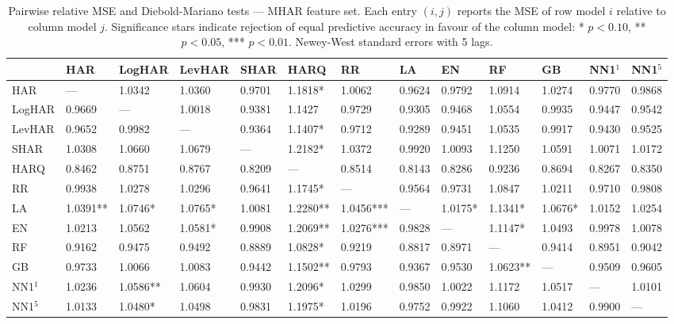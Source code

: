 \begin{table}[htbp]
\caption{Pairwise relative MSE and Diebold-Mariano tests — MHAR feature set. Each entry $(i,j)$ reports the MSE of row model $i$ relative to column model $j$. Significance stars indicate rejection of equal predictive accuracy in favour of the column model: * $p<0.10$, ** $p<0.05$, *** $p<0.01$. Newey-West standard errors with 5 lags.}
\label{tab:pairwise_mse_mhar}
\begin{tabular}{lllllllllllll}
\toprule
 & HAR & LogHAR & LevHAR & SHAR & HARQ & RR & LA & EN & RF & GB & NN1$^1$ & NN1$^5$ \\
\midrule
HAR & — & 1.0342 & 1.0360 & 0.9701 & 1.1818* & 1.0062 & 0.9624 & 0.9792 & 1.0914 & 1.0274 & 0.9770 & 0.9868 \\
LogHAR & 0.9669 & — & 1.0018 & 0.9381 & 1.1427 & 0.9729 & 0.9305 & 0.9468 & 1.0554 & 0.9935 & 0.9447 & 0.9542 \\
LevHAR & 0.9652 & 0.9982 & — & 0.9364 & 1.1407* & 0.9712 & 0.9289 & 0.9451 & 1.0535 & 0.9917 & 0.9430 & 0.9525 \\
SHAR & 1.0308 & 1.0660 & 1.0679 & — & 1.2182* & 1.0372 & 0.9920 & 1.0093 & 1.1250 & 1.0591 & 1.0071 & 1.0172 \\
HARQ & 0.8462 & 0.8751 & 0.8767 & 0.8209 & — & 0.8514 & 0.8143 & 0.8286 & 0.9236 & 0.8694 & 0.8267 & 0.8350 \\
RR & 0.9938 & 1.0278 & 1.0296 & 0.9641 & 1.1745* & — & 0.9564 & 0.9731 & 1.0847 & 1.0211 & 0.9710 & 0.9808 \\
LA & 1.0391** & 1.0746* & 1.0765* & 1.0081 & 1.2280** & 1.0456*** & — & 1.0175* & 1.1341* & 1.0676* & 1.0152 & 1.0254 \\
EN & 1.0213 & 1.0562 & 1.0581* & 0.9908 & 1.2069** & 1.0276*** & 0.9828 & — & 1.1147* & 1.0493 & 0.9978 & 1.0078 \\
RF & 0.9162 & 0.9475 & 0.9492 & 0.8889 & 1.0828* & 0.9219 & 0.8817 & 0.8971 & — & 0.9414 & 0.8951 & 0.9042 \\
GB & 0.9733 & 1.0066 & 1.0083 & 0.9442 & 1.1502** & 0.9793 & 0.9367 & 0.9530 & 1.0623** & — & 0.9509 & 0.9605 \\
NN1$^1$ & 1.0236 & 1.0586** & 1.0604 & 0.9930 & 1.2096* & 1.0299 & 0.9850 & 1.0022 & 1.1172 & 1.0517 & — & 1.0101 \\
NN1$^5$ & 1.0133 & 1.0480* & 1.0498 & 0.9831 & 1.1975* & 1.0196 & 0.9752 & 0.9922 & 1.1060 & 1.0412 & 0.9900 & — \\
\bottomrule
\end{tabular}
\end{table}
